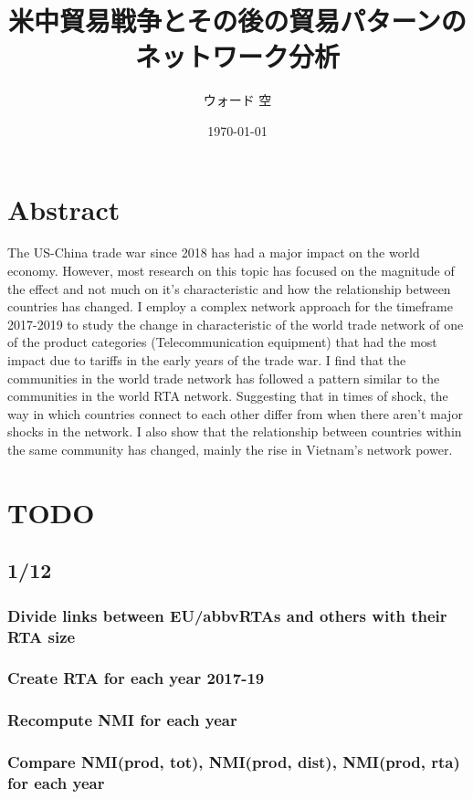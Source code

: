 \documentclass[a4paper, 12pt]{article}
\title{米中貿易戦争とその後の貿易パターンのネットワーク分析}
\author{ウォード 空}
\date{\today}
\begin{document}
\maketitle
\newpage

\section*{Abstract}
The US-China trade war since 2018 has had a major impact on the world economy. 
However, most research on this topic has focused on the magnitude of the effect
and not much on it's characteristic and how the relationship between countries
has changed.
I employ a complex network approach for the timeframe 2017-2019 to study the 
change in characteristic of the world trade network of one of the product 
categories (Telecommunication equipment) that had the most impact due to 
tariffs in the early years of the trade war.
I find that the communities in the world trade network has followed a pattern 
similar to the communities in the world RTA network.
Suggesting that in times of shock, the way in which countries connect to each 
other differ from when there aren't major shocks in the network.
I also show that the relationship between countries within the same community 
has changed, mainly the rise in Vietnam's network power.
\newpage

\tableofcontents
\newpage

\section{TODO}
\subsection{1/12}
\subsubsection{Divide links between EU/abbvRTAs and others with their RTA size}
\subsubsection{Create RTA for each year 2017-19}
\subsubsection{Recompute NMI for each year}
\subsubsection{Compare NMI(prod, tot), NMI(prod, dist), NMI(prod, rta)
for each year}
\end{document}

